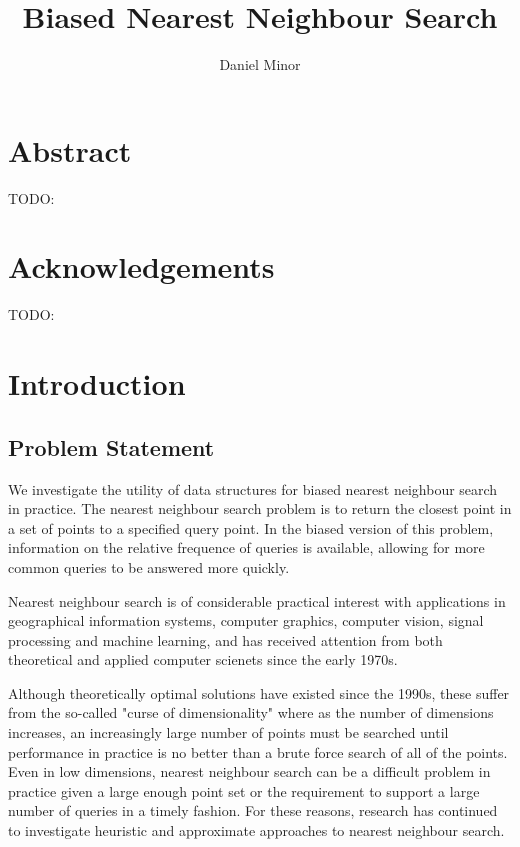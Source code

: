 \documentclass[mcs]{scsthesis}
\title {Biased Nearest Neighbour Search}
\author {Daniel Minor}
\begin{document}
\newtheorem*{thm}{Theorem}[section]

\beforepreface

\prefacesection

\chapter*{Abstract}

TODO:

\chapter*{Acknowledgements}

TODO:

\afterpreface

\chapter{Introduction}

\section{Problem Statement}

We investigate the utility of data structures for biased nearest neighbour
search in practice. The nearest neighbour search problem is to return the
closest point in a set of points to a specified query point. In the biased
version of this problem, information on the relative frequence of queries
is available, allowing for more common queries to be answered more quickly.

Nearest neighbour search is of considerable practical interest with
applications in geographical information systems, computer graphics,
computer vision, signal processing and machine learning, and has received
attention from both theoretical and applied computer scienets since the early
1970s.

Although theoretically optimal solutions have existed since the 1990s, these
suffer from the so-called "curse of dimensionality" where as the number of
dimensions increases, an increasingly large number of points must be searched
until performance in practice is no better than a brute force search of all of
the points. Even in low dimensions, nearest neighbour search can be a difficult
problem in practice given a large enough point set or the requirement to support
a large number of queries in a timely fashion. For these reasons, research has
continued to investigate heuristic and approximate approaches to nearest
neighbour search. 
 
\end{document}
